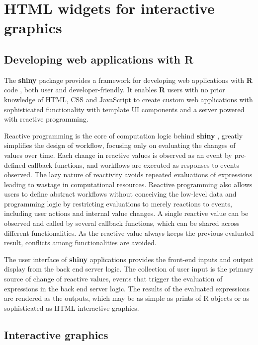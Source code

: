 \documentclass{aucklandthesis}
\begin{document}
\hypertarget{html-widgets-for-interactive-graphics}{%
\section{HTML widgets for interactive graphics}\label{html-widgets-for-interactive-graphics}}

\hypertarget{sec:shiny}{%
\subsection{Developing web applications with R}\label{sec:shiny}}

The \textbf{shiny} package \autocite{shiny} provides a framework for developing web applications with \textbf{R} code \autocite{R2021}, both user and developer-friendly. It enables \textbf{R} users with no prior knowledge of HTML, CSS and JavaScript to create custom web applications with sophisticated functionality with template UI components and a server powered with reactive programming.

Reactive programming is the core of computation logic behind \textbf{shiny} \autocite{mshiny}, greatly simplifies the design of workflow, focusing only on evaluating the changes of values over time. Each change in reactive values is observed as an event by pre-defined callback functions, and workflows are executed as responses to events observed. The lazy nature of reactivity avoids repeated evaluations of expressions leading to wastage in computational resources. Reactive programming also allows users to define abstract workflows without conceiving the low-level data and programming logic by restricting evaluations to merely reactions to events, including user actions and internal value changes. A single reactive value can be observed and called by several callback functions, which can be shared across different functionalities. As the reactive value always keeps the previous evaluated result, conflicts among functionalities are avoided.

The user interface of \textbf{shiny} applications provides the front-end inputs and output display from the back end server logic. The collection of user input is the primary source of change of reactive values, events that trigger the evaluation of expressions in the back end server logic. The results of the evaluated expressions are rendered as the outputs, which may be as simple as prints of R objects or as sophisticated as HTML interactive graphics.

\hypertarget{sec:int-graphics}{%
\subsection{Interactive graphics}\label{sec:int-graphics}}
\end{document}
